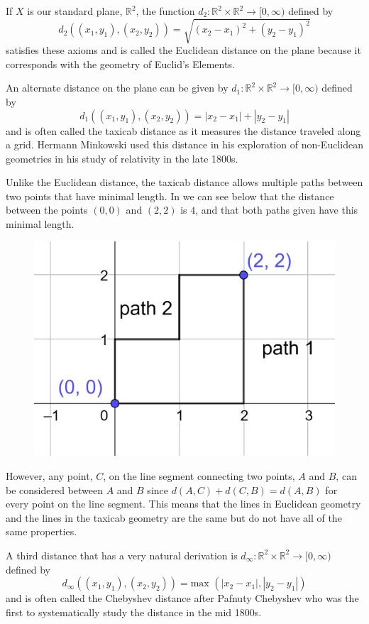 \documentclass[
]{book}
\theoremstyle{definition}
\theoremstyle{definition}
\theoremstyle{definition}
\theoremstyle{definition}
\theoremstyle{remark}
\begin{document}
If \(X\) is our standard plane, \(\mathbb{R}^2\), the function \(d_2:\mathbb{R}^2\times \mathbb{R}^2 \rightarrow [0,\infty)\) defined by
\[d_2\left( (x_1,y_1), (x_2,y_2)\right) = \sqrt{ (x_2-x_1)^2 + (y_2-y_1)^2}\] satisfies these axioms and is called the Euclidean distance on the plane because it corresponds with the geometry of Euclid's Elements.

An alternate distance on the plane can be given by \(d_1:\mathbb{R}^2 \times \mathbb{R}^2 \rightarrow [0,\infty)\) defined by \[d_1\left( (x_1,y_1), (x_2,y_2)\right) = |x_2-x_1| + |y_2-y_1|\] and is often called the taxicab distance as it measures the distance traveled along a grid. Hermann Minkowski used this distance in his exploration of non-Euclidean geometries in his study of relativity in the late 1800s.

Unlike the Euclidean distance, the taxicab distance allows multiple paths between two points that have minimal length. In we can see below that the distance between the points \((0,0)\) and \((2,2)\) is \(4\), and that both paths given have this minimal length.

\begin{figure}

{\centering \includegraphics[width=0.3\linewidth]{images/distance_multiple_paths} 

}

\end{figure}

However, any point, \(C\), on the line segment connecting two points, \(A\) and \(B\), can be considered between \(A\) and \(B\) since \(d(A,C)+d(C,B) = d(A,B)\) for every point on the line segment. This means that the lines in Euclidean geometry and the lines in the taxicab geometry are the same but do not have all of the same properties.

A third distance that has a very natural derivation is \(d_\infty: \mathbb{R}^2\times \mathbb{R}^2 \rightarrow [0,\infty)\) defined by \[d_\infty \left( (x_1,y_1), (x_2,y_2)\right) = \mbox{max } (|x_2-x_1|,|y_2-y_1|) \] and is often called the Chebyshev distance after Pafnuty Chebyshev who was the first to systematically study the distance in the mid 1800s.
\end{document}
